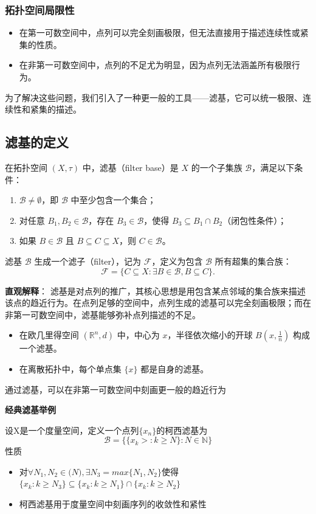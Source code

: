 \documentclass[a4paper, oneside]{article}
\begin{document}
\subsubsection{拓扑空间局限性}
\begin{itemize}
    \item 在第一可数空间中，点列可以完全刻画极限，但无法直接用于描述连续性或紧集的性质。
    \item 在非第一可数空间中，点列的不足尤为明显，因为点列无法涵盖所有极限行为。
\end{itemize}
为了解决这些问题，我们引入了一种更一般的工具——滤基，它可以统一极限、连续性和紧集的描述。

\subsection{滤基的定义}
在拓扑空间 $(X, \tau)$ 中，滤基（filter base）是 $X$ 的一个子集族 $\mathcal{B}$，满足以下条件：
\begin{enumerate}
    \item $\mathcal{B} \neq \emptyset$，即 $\mathcal{B}$ 中至少包含一个集合；
    \item 对任意 $B_1, B_2 \in \mathcal{B}$，存在 $B_3 \in \mathcal{B}$，使得 $B_3 \subseteq B_1 \cap B_2$（闭包性条件）；
    \item 如果 $B \in \mathcal{B}$ 且 $B \subseteq C \subseteq X$，则 $C \in \mathcal{B}$。
\end{enumerate}

滤基 $\mathcal{B}$ 生成一个滤子（filter），记为 $\mathcal{F}$，定义为包含 $\mathcal{B}$ 所有超集的集合族：
\[
\mathcal{F} = \{C \subseteq X : \exists B \in \mathcal{B}, B \subseteq C\}.
\]

\textbf{直观解释}：
滤基是对点列的推广，其核心思想是用包含某点邻域的集合族来描述该点的趋近行为。在点列足够的空间中，点列生成的滤基可以完全刻画极限；而在非第一可数空间中，滤基能够弥补点列描述的不足。
\begin{itemize}
    \item 在欧几里得空间 $(\mathbb{R}^n, d)$ 中，中心为 $x$，半径依次缩小的开球 \( B(x, \frac{1}{n}) \) 构成一个滤基。
    \item 在离散拓扑中，每个单点集 $\{x\}$ 都是自身的滤基。
\end{itemize}
通过滤基，可以在非第一可数空间中刻画更一般的趋近行为

\textbf{经典滤基举例}

设X是一个度量空间，定义一个点列$\{x_n\}$的柯西滤基为
\[
    \mathcal{B} = \{\{x_k > : k \geq N \}: N \in \mathbb{N} \}
\]
性质
\begin{itemize}
    \item 对$\forall N_1, N_2 \in \mathbb(N), \exists N_3 = max\{N_1, N_2\}$使得$\{x_k:k \geq N_3\} \subseteq \{x_k:k \geq N_1\} \cap \{x_k: k \geq N_2\}$
    \item 柯西滤基用于度量空间中刻画序列的收敛性和紧性
\end{itemize}
\end{document}
